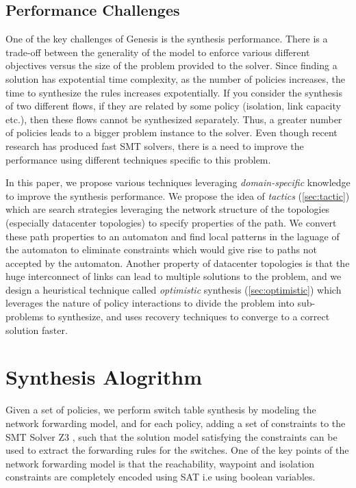 \documentclass[]{sig}
\begin{document}
\subsection{Performance Challenges} \label{sec:performance}
One of the key challenges of Genesis is the synthesis performance. There is a trade-off between the generality of the model to enforce various different objectives versus the size of the problem provided to the solver.  Since finding a solution has expotential time complexity, as the number of policies increases, the time to synthesize the rules increases expotentially. If you consider the synthesis of two different flows, if they are related by some policy (isolation, link capacity etc.), then these flows cannot be synthesized separately. Thus, a greater number of policies leads to a bigger problem instance to the solver. Even though recent research has produced fast SMT solvers, there is a need to improve the performance using different techniques specific to this problem. 

In this paper, we propose various techniques leveraging \emph{domain-specific} knowledge to improve the synthesis performance. We propose the idea of \emph{tactics} (\cref{sec:tactic}) which are search strategies leveraging the network structure of the topologies (especially datacenter topologies) to specify properties of the path. We convert these path properties to an automaton and find local patterns in the laguage of the automaton to eliminate constraints which would give rise to paths not accepted by the automaton. Another property of datacenter topologies is that the huge interconnect of links can lead to multiple solutions to the problem, and we design a heuristical technique called \emph{optimistic} synthesis (\cref{sec:optimistic}) which leverages the nature of policy interactions to divide the problem into sub-problems to synthesize, and uses recovery techniques to converge to a correct solution faster. 
\section{Synthesis Alogrithm}
Given a set of policies, we perform switch table synthesis by modeling the network forwarding model, and for each policy, adding a set of constraints to the SMT Solver Z3 \cite{z3}, such that the solution model satisfying the constraints can be used to extract the forwarding rules for the switches. One of the key points of the network forwarding model is that the reachability, waypoint and isolation constraints are completely encoded using SAT i.e using boolean variables. 
\end{document}
